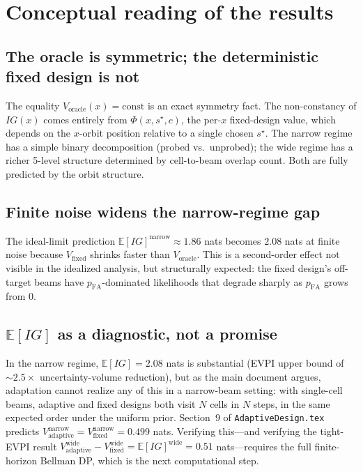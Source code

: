 \documentclass[11pt,a4paper]{article}
\newcommand{\E}{\mathbb{E}}
\begin{document}
\section{Conceptual reading of the results}

\subsection{The oracle is symmetric; the deterministic fixed design is not}
The equality $V_{\text{oracle}}(x) = \mathrm{const}$ is an exact symmetry fact.  The non-constancy of $IG(x)$ comes entirely from $\Phi(x, s^\star, c)$, the per-$x$ fixed-design value, which depends on the $x$-orbit position relative to a single chosen $s^\star$.  The narrow regime has a simple binary decomposition (probed vs.\ unprobed); the wide regime has a richer 5-level structure determined by cell-to-beam overlap count.  Both are fully predicted by the orbit structure.

\subsection{Finite noise widens the narrow-regime gap}
The ideal-limit prediction $\E[IG]^{\text{narrow}} \approx 1.86$ nats becomes $2.08$ nats at finite noise because $V_{\text{fixed}}$ shrinks faster than $V_{\text{oracle}}$.  This is a second-order effect not visible in the idealized analysis, but structurally expected: the fixed design's off-target beams have $p_{\mathrm{FA}}$-dominated likelihoods that degrade sharply as $p_{\mathrm{FA}}$ grows from 0.

\subsection{$\E[IG]$ as a diagnostic, not a promise}
In the narrow regime, $\E[IG] = 2.08$ nats is substantial (EVPI upper bound of $\sim 2.5\times$ uncertainty-volume reduction), but as the main document argues, adaptation cannot realize any of this in a narrow-beam setting: with single-cell beams, adaptive and fixed designs both visit $N$ cells in $N$ steps, in the same expected order under the uniform prior.  Section~9 of \texttt{AdaptiveDesign.tex} predicts $V_{\text{adaptive}}^{\text{narrow}} = V_{\text{fixed}}^{\text{narrow}} = 0.499$ nats.  Verifying this---and verifying the tight-EVPI result $V_{\text{adaptive}}^{\text{wide}} - V_{\text{fixed}}^{\text{wide}} = \E[IG]^{\text{wide}} = 0.51$ nats---requires the full finite-horizon Bellman DP, which is the next computational step.
\end{document}
